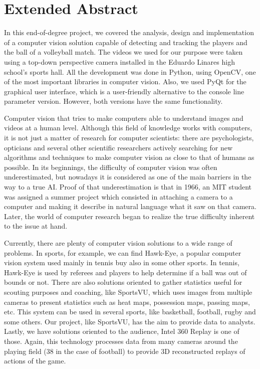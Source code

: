 \newpage
\section*{Extended Abstract}

In this end-of-degree project, we covered the analysis, design and implementation of a computer vision solution capable of detecting and tracking the players and the ball of a volleyball match. The videos we used for our purpose were taken using a top-down perspective camera installed in the Eduardo Linares high school’s sports hall. All the development was done in Python, using OpenCV, one of the most important libraries in computer vision. Also, we used PyQt for the graphical user interface, which is a user-friendly alternative to the console line parameter version. However, both versions have the same functionality. 

Computer vision that tries to make computers able to understand images and videos at a human level. Although this field of knowledge works with computers, it is not just a matter of research for computer scientists: there are psychologists, opticians and several other scientific researchers actively searching for new algorithms and techniques to make computer vision as close to that of humans as possible. In its beginnings, the difficulty of computer vision was often underestimated, but nowadays it is considered as one of the main barriers in the way to a true AI. Proof of that underestimation is that in 1966, an MIT student was assigned a summer project which consisted in attaching a camera to a computer and making it describe in natural language what it saw on that camera. Later, the world of computer research began to realize the true difficulty inherent to the issue at hand.

Currently, there are plenty of computer vision solutions to a wide range of problems. In sports, for example, we can find Hawk-Eye, a popular computer vision system used mainly in tennis buy also in some other sports. In tennis, Hawk-Eye is used by referees and players to help determine if a ball was out of bounds or not. There are also solutions oriented to gather statistics useful for scouting purposes and coaching, like SportsVU, which uses images from multiple cameras to present statistics such as heat maps, possession maps, passing maps, etc. This system can be used in several sports, like basketball, football, rugby and some others. Our project, like SportsVU, has the aim to provide data to analysts. Lastly, we have solutions oriented to the audience, Intel 360 Replay is one of those. Again, this technology processes data from many cameras around the playing field (38 in the case of football) to provide 3D reconstructed replays of actions of the game.

